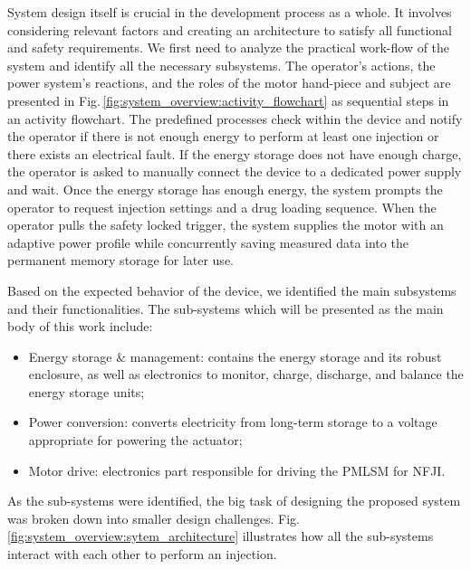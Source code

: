     System design itself is crucial in the development process as a whole. It involves considering relevant factors and creating an architecture to satisfy all functional and safety requirements. We first need to analyze the practical work-flow of the system and identify all the necessary subsystems. The operator’s actions, the power system’s reactions, and the roles of the motor hand-piece and subject are presented in Fig.\,\ref{fig:system_overview:activity_flowchart} as sequential steps in an activity flowchart. The predefined processes check within the device and notify the operator if there is not enough energy to perform at least one injection or there exists an electrical fault. If the energy storage does not have enough charge, the operator is asked to manually connect the device to a dedicated power supply and wait. Once the energy storage has enough energy, the system prompts the operator to request injection settings and a drug loading sequence. When the operator pulls the safety locked trigger, the system supplies the motor with an adaptive power profile while concurrently saving measured data into the permanent memory storage for later use. 

    Based on the expected behavior of the device, we identified the main subsystems and their functionalities. The sub-systems which will be presented as the main body of this work include:
    \begin{itemize}
    \item Energy storage $\&$ management: contains the energy storage and its robust enclosure, as well as electronics to monitor, charge, discharge, and balance the energy storage units;
    \item Power conversion: converts electricity from long-term storage to a voltage appropriate for powering the actuator;
    \item Motor drive: electronics part responsible for driving the PMLSM for NFJI.
    \end{itemize}
    
    As the sub-systems were identified, the big task of designing the proposed system was broken down into smaller design challenges. Fig.\,\ref{fig:system_overview:sytem_architecture} illustrates how all the sub-systems interact with each other to perform an injection.  
    
